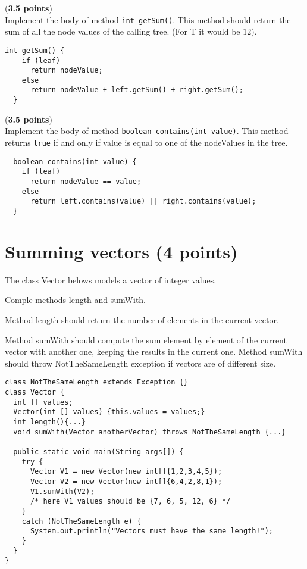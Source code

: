 \documentclass[correction]{exercices}
\begin{document}
\begin{question} (\textbf{3.5 points})\\
Implement the body of method \lstinline!int getSum()!.
This method should return the sum of all the node values of the calling tree.
(For T it would be $12$).

\begin{correction}
\begin{verbatim}
int getSum() {
    if (leaf)
      return nodeValue;
    else
      return nodeValue + left.getSum() + right.getSum();
  }
\end{verbatim}
\end{correction}
\end{question}

\begin{question} (\textbf{3.5 points}) \\
Implement the body of method \lstinline!boolean contains(int value)!.
This method returns \lstinline!true! if and only if value is equal to one
of the nodeValues in the tree.

\begin{correction}
\begin{verbatim}
  boolean contains(int value) {
    if (leaf) 
      return nodeValue == value;
    else
      return left.contains(value) || right.contains(value);
  }
\end{verbatim}
\end{correction}
\end{question}

\section{Summing vectors (4 points)}

The class Vector belows models a vector of integer values.

Comple methods length and sumWith.

Method length should return the number of elements in the current vector.

Method sumWith should compute the sum element by element of the current 
vector with another one, keeping the results in the current one.
Method sumWith should throw NotTheSameLength exception if vectors are of
different size.

\begin{verbatim}
class NotTheSameLength extends Exception {}
class Vector {
  int [] values;
  Vector(int [] values) {this.values = values;}
  int length(){...}
  void sumWith(Vector anotherVector) throws NotTheSameLength {...}

  public static void main(String args[]) {
    try {
      Vector V1 = new Vector(new int[]{1,2,3,4,5});
      Vector V2 = new Vector(new int[]{6,4,2,8,1});
      V1.sumWith(V2);
      /* here V1 values should be {7, 6, 5, 12, 6} */
    }
    catch (NotTheSameLength e) {
      System.out.println("Vectors must have the same length!");
    }
  }
}
\end{verbatim}
\end{document}
